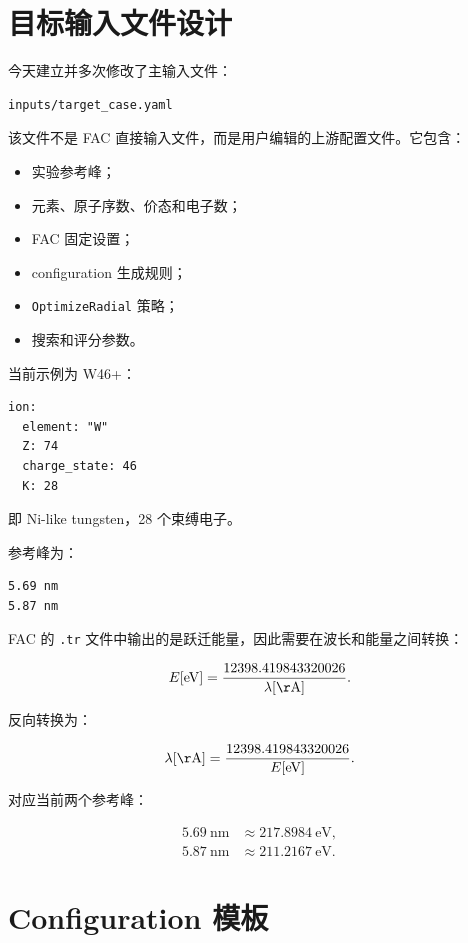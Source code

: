 \documentclass[11pt,a4paper]{article}
\begin{document}
\section{目标输入文件设计}

今天建立并多次修改了主输入文件：

\begin{lstlisting}
inputs/target_case.yaml
\end{lstlisting}

该文件不是 FAC 直接输入文件，而是用户编辑的上游配置文件。它包含：

\begin{itemize}
  \item 实验参考峰；
  \item 元素、原子序数、价态和电子数；
  \item FAC 固定设置；
  \item configuration 生成规则；
  \item \texttt{OptimizeRadial} 策略；
  \item 搜索和评分参数。
\end{itemize}

当前示例为 W46+：

\begin{lstlisting}
ion:
  element: "W"
  Z: 74
  charge_state: 46
  K: 28
\end{lstlisting}

即 Ni-like tungsten，28 个束缚电子。

参考峰为：

\begin{lstlisting}
5.69 nm
5.87 nm
\end{lstlisting}

FAC 的 \texttt{.tr} 文件中输出的是跃迁能量，因此需要在波长和能量之间转换：

\[
E[\mathrm{eV}] =
\frac{12398.419843320026}{\lambda[\mathrm{\AA}]}.
\]

反向转换为：

\[
\lambda[\mathrm{\AA}] =
\frac{12398.419843320026}{E[\mathrm{eV}]}.
\]

对应当前两个参考峰：

\begin{align}
5.69~\mathrm{nm} &\approx 217.8984~\mathrm{eV},\\
5.87~\mathrm{nm} &\approx 211.2167~\mathrm{eV}.
\end{align}

\section{Configuration 模板}
\end{document}
